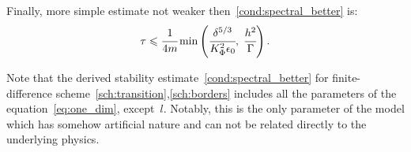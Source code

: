 Finally, more simple estimate not weaker then~\eqref{cond:spectral_better} is:
\begin{equation}
  \tau \leqslant \cfrac{1}{4m} \min \left(\cfrac{\delta^{5 / 3}}{K_\Phi^2 \epsilon_0}, \; \cfrac{h^2}{\Gamma} \right) {\text{.}}
  \label{cond:spectral_better_simpler}
\end{equation}

Note that the derived stability estimate~\eqref{cond:spectral_better}
for finite-difference scheme~\eqref{sch:transition},\eqref{sch:borders}
includes all the parameters of the equation~\eqref{eq:one_dim}, except~$l$.
Notably, this is the only parameter of the model which has somehow artificial nature and can not be
related directly to the underlying physics.

\endinput
